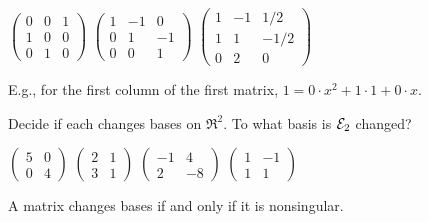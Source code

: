 \begin{exercises}
\begin{answer}
      \begin{exparts*}
        \partsitem \( \begin{pmatrix}
                   0  &0  &1  \\
                   1  &0  &0  \\
                   0  &1  &0
                 \end{pmatrix} \)
        \partsitem \( \begin{pmatrix}
                   1  &-1 &0  \\
                   0  &1  &-1 \\
                   0  &0  &1
                 \end{pmatrix} \)
        \partsitem \( \begin{pmatrix}
                   1  &-1 &1/2  \\
                   1  &1  &-1/2 \\
                   0  &2  &0
                 \end{pmatrix} \)
      \end{exparts*}  
      E.g., for the first column of the first matrix,
      $1=0\cdot x^2+1\cdot 1+0\cdot x$.
     \end{answer}
  \recommended \item 
    Decide if each changes bases on \( \Re^2 \).
    To what basis is \( {\cal E}_2 \) changed?
    \begin{exparts*}
      \partsitem \( \begin{pmatrix}
                 5  &0  \\
                 0  &4
               \end{pmatrix}  \)
      \partsitem \( \begin{pmatrix}
                 2  &1  \\
                 3  &1
               \end{pmatrix}  \)
      \partsitem \( \begin{pmatrix}
                -1  &4  \\
                 2  &-8
               \end{pmatrix}  \)
      \partsitem \( \begin{pmatrix}
                 1  &-1 \\
                 1  &1
               \end{pmatrix}  \)
    \end{exparts*}
    \begin{answer}
       A matrix changes bases if and only if it is nonsingular.

\end{answer}
\end{exercises}
